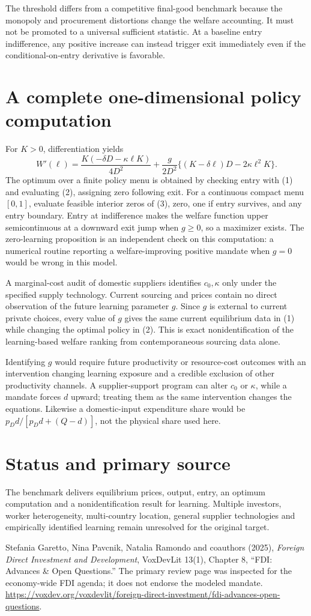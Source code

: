 \documentclass[11pt]{article}
\begin{document}
The threshold differs from a competitive final-good benchmark because the monopoly and procurement distortions change the welfare accounting. It must not be promoted to a universal sufficient statistic. At a baseline entry indifference, any positive increase can instead trigger exit immediately even if the conditional-on-entry derivative is favorable.

\section*{A complete one-dimensional policy computation}
For $K>0$, differentiation yields
\[
 W'(\ell)=\frac{K(-\delta D-\kappa\ell K)}{4D^2}
 +\frac g{2D^2}\{(K-\delta\ell)D-2\kappa\ell^2K\}. \tag{3}
\]
The optimum over a finite policy menu is obtained by checking entry with (1) and evaluating (2), assigning zero following exit. For a continuous compact menu $[0,1]$, evaluate feasible interior zeros of (3), zero, one if entry survives, and any entry boundary. Entry at indifference makes the welfare function upper semicontinuous at a downward exit jump when $g\geq0$, so a maximizer exists. The zero-learning proposition is an independent check on this computation: a numerical routine reporting a welfare-improving positive mandate when $g=0$ would be wrong in this model.

A marginal-cost audit of domestic suppliers identifies $c_0,\kappa$ only under the specified supply technology. Current sourcing and prices contain no direct observation of the future learning parameter $g$. Since $g$ is external to current private choices, every value of $g$ gives the same current equilibrium data in (1) while changing the optimal policy in (2). This is exact nonidentification of the learning-based welfare ranking from contemporaneous sourcing data alone.

Identifying $g$ would require future productivity or resource-cost outcomes with an intervention changing learning exposure and a credible exclusion of other productivity channels. A supplier-support program can alter $c_0$ or $\kappa$, while a mandate forces $d$ upward; treating them as the same intervention changes the equations. Likewise a domestic-input expenditure share would be $p_Dd/[p_Dd+(Q-d)]$, not the physical share used here.

\section*{Status and primary source}
The benchmark delivers equilibrium prices, output, entry, an optimum computation and a nonidentification result for learning. Multiple investors, worker heterogeneity, multi-country location, general supplier technologies and empirically identified learning remain unresolved for the original target.

Stefania Garetto, Nina Pavcnik, Natalia Ramondo and coauthors (2025), \emph{Foreign Direct Investment and Development}, VoxDevLit 13(1), Chapter 8, ``FDI: Advances \& Open Questions.'' The primary review page was inspected for the economy-wide FDI agenda; it does not endorse the modeled mandate. \url{https://voxdev.org/voxdevlit/foreign-direct-investment/fdi-advances-open-questions}.
\end{document}
